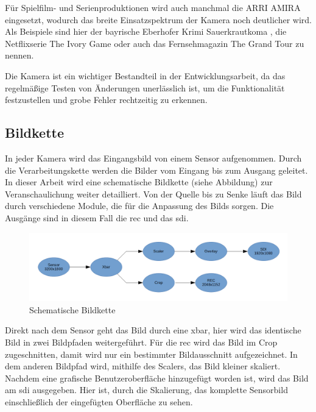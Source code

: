 Für Spielfilm- und Serienproduktionen wird auch manchmal die \ac{ARRI} AMIRA eingesetzt, wodurch das breite Einsatzspektrum der Kamera noch deutlicher wird.
Als Beispiele sind hier der bayrische Eberhofer Krimi \glqq Sauerkrautkoma\grqq{} \cite{arrikrimi}, die Netflixserie \glqq The Ivory Game\grqq{} \cite{imdbivory} oder auch das Fernsehmagazin \glqq The Grand Tour\grqq{} \cite{imdbtour} zu nennen.
 
Die Kamera ist ein wichtiger Bestandteil in der Entwicklungsarbeit, da das regelmäßige Testen von Änderungen unerlässlich ist, um die Funktionalität festzustellen und grobe Fehler rechtzeitig zu erkennen.

\subsection{Bildkette}\label{sec:bildkette}
In jeder Kamera wird das Eingangsbild von einem Sensor aufgenommen. Durch die Verarbeitungskette werden die Bilder vom Eingang bis zum Ausgang geleitet. In dieser Arbeit wird eine schematische Bildkette (siehe Abbildung) zur Veranschaulichung weiter detailliert. Von der Quelle bis zu Senke läuft das Bild durch verschiedene Module, die für die Anpassung des Bilds sorgen. Die Ausgänge sind in diesem Fall die \ac{rec} und das \ac{sdi}.

\begin{figure}[!hbtp]
	\centering
	\includegraphics[width = \linewidth]{pictures/2019-11-17_Bildkette.png}
	\smallskip
	\caption{Schematische Bildkette}
	\label{fig:bild}
\end{figure} 

Direkt nach dem Sensor geht das Bild durch eine \ac{xbar}, hier wird das identische Bild in zwei Bildpfaden weitergeführt. Für die \acl{rec} wird das Bild im Crop zugeschnitten, damit wird nur ein bestimmter Bildausschnitt aufgezeichnet. In dem anderen Bildpfad wird, mithilfe des Scalers, das Bild kleiner skaliert. Nachdem eine grafische Benutzeroberfläche hinzugefügt worden ist, wird das Bild am \ac{sdi} ausgegeben. Hier ist, durch die Skalierung, das komplette Sensorbild einschließlich der eingefügten Oberfläche zu sehen.

